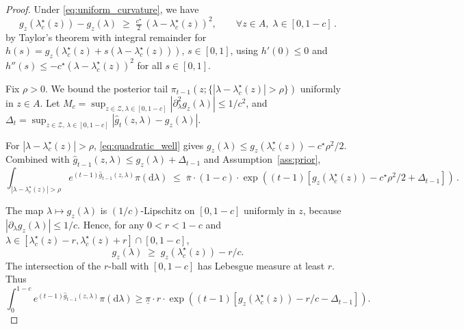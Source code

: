 \documentclass[12pt,twoside]{article}
\theoremstyle{plain}
\theoremstyle{definition}
\theoremstyle{remark}
\newcommand{\calZ}{\mathcal{Z}}
\newcommand{\fbet}{\lambda}  %
\begin{document}
\begin{proof}
Under \eqref{eq:uniform_curvature}, we have
\begin{equation}\label{eq:quadratic_well}
    g_z(\fbet^\star_c(z))-g_z(\lambda) \;\ge\; \tfrac{c^\star}{2}\,(\lambda-\fbet^\star_c(z))^2,
    \qquad \forall z\in A,\;\lambda\in[0,1-c]\,.
\end{equation}
by Taylor's theorem with integral remainder for $h(s)=g_z(\fbet^\star_c(z)+s(\lambda-\fbet^\star_c(z)))$, $s\in[0,1]$, using $h'(0)\le 0$ and $h''(s)\le -c^\star(\lambda-\fbet^\star_c(z))^2$ for all $s\in[0,1]$.


Fix $\rho>0$. We bound the posterior tail
$\pi_{t-1}(z;\{|\lambda-\fbet^\star_c(z)|>\rho\})$ uniformly in $z\in A$.
Let $M_c=\sup_{z\in\calZ,\lambda\in[0,1-c]}|\partial_\lambda^2 g_z(\lambda)|\le 1/c^2$, and $\Delta_t=\sup_{z\in\calZ,\,\lambda\in[0,1-c]}|\hat g_t(z,\lambda)-g_z(\lambda)|$. 

For
$|\lambda-\fbet^\star_c(z)|>\rho$, \eqref{eq:quadratic_well} gives
$g_z(\lambda)\le g_z(\fbet^\star_c(z))-c^\star\rho^2/2$. Combined with
$\hat g_{t-1}(z,\lambda)\le g_z(\lambda)+\Delta_{t-1}$ and
Assumption~\ref{ass:prior},
\begin{equation*}
    \int_{|\lambda-\fbet^\star_c(z)|>\rho} e^{(t-1)\hat g_{t-1}(z,\lambda)}\pi(\mathrm{d}\lambda)
    \;\le\; \overline\pi\cdot(1-c)\cdot
    \exp\left((t-1)[g_z(\fbet^\star_c(z))-c^\star\rho^2/2+\Delta_{t-1}]\right)\,.
\end{equation*}

The map $\lambda\mapsto g_z(\lambda)$
is $(1/c)$-Lipschitz on $[0,1-c]$ uniformly in $z$, because
$|\partial_\lambda g_z(\lambda)|\le 1/c$. Hence, for any $0<r<1-c$ and $\lambda\in [\fbet^\star_c(z)-r,\fbet^\star_c(z)+r]\cap[0,1-c]$,
\begin{equation*}
    g_z(\lambda) \;\ge\; g_z(\fbet^\star_c(z)) - r/c.
\end{equation*}
The
intersection of the $r$-ball with $[0,1-c]$ has Lebesgue measure at
least $r$. Thus
\begin{equation*}
    \int_0^{1-c} e^{(t-1)\hat g_{t-1}(z,\lambda)}\pi(\mathrm{d}\lambda)
   \geq \underline\pi\cdot r\cdot
    \exp\left((t-1)[g_z(\fbet^\star_c(z))-r/c-\Delta_{t-1}]\right).
\end{equation*}


\end{proof}
\end{document}
